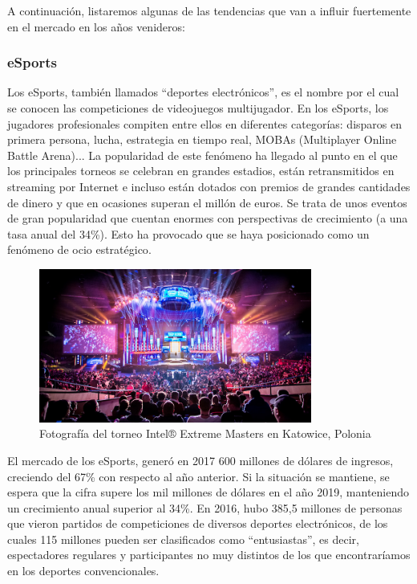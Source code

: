 A continuación, listaremos algunas de las tendencias que van a influir fuertemente en el mercado en los años venideros:

\subsubsection{eSports}
Los eSports, también llamados ``deportes electrónicos'', es el nombre por el cual se conocen las competiciones de videojuegos multijugador. En los eSports, los jugadores profesionales compiten entre ellos en diferentes categorías: disparos en primera persona, lucha, estrategia en tiempo real, MOBAs (Multiplayer Online Battle Arena)... La popularidad de este fenómeno ha llegado al punto en el que los principales torneos se celebran en grandes estadios, están retransmitidos en streaming por Internet e incluso están dotados con premios de grandes cantidades de dinero y que en ocasiones superan el millón de euros. Se trata de unos eventos de gran popularidad que cuentan enormes con perspectivas de crecimiento (a una tasa anual del 34\%). Esto ha provocado que se haya posicionado como un fenómeno de ocio estratégico\cite{libro_blanco}.

\begin{figure}[h]
    \centering
    \includegraphics[width=0.8\textwidth]{images/estadodelarte/mercado/foto-torneo-esport}
    \caption{Fotografía del torneo Intel® Extreme Masters en Katowice, Polonia}
\end{figure}

El mercado de los eSports, generó en 2017 600 millones de dólares de ingresos, creciendo del 67\% con respecto al año anterior. Si la situación se mantiene, se espera que la cifra supere los mil millones de dólares en el año 2019, manteniendo un crecimiento anual superior al 34\%. En 2016, hubo 385,5 millones de personas que vieron partidos de competiciones de diversos deportes electrónicos, de los cuales 115 millones pueden ser clasificados como ``entusiastas'', es decir, espectadores regulares y participantes no muy distintos de los que encontraríamos en los deportes convencionales\cite{libro_blanco}.

